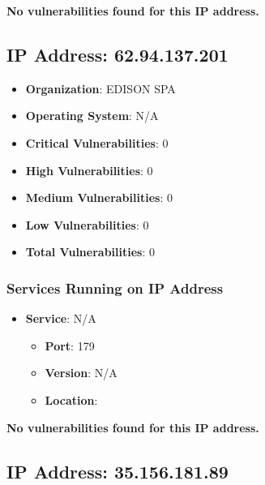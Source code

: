 \documentclass{article}
\begin{document}
\textbf{No vulnerabilities found for this IP address.}




\clearpage



\subsection{IP Address: 62.94.137.201}

\begin{itemize}
    \item \textbf{Organization}: EDISON SPA
    \item \textbf{Operating System}:  N/A 
    \item \textbf{Critical Vulnerabilities}: 0
    \item \textbf{High Vulnerabilities}: 0
    \item \textbf{Medium Vulnerabilities}: 0
    \item \textbf{Low Vulnerabilities}: 0
    \item \textbf{Total Vulnerabilities}: 0
\end{itemize}

\subsubsection*{Services Running on IP Address}

\begin{itemize}
    
        \item \textbf{Service}: N/A
        \begin{itemize}
            \item \textbf{Port}: 179
            \item \textbf{Version}:  N/A 
            \item \textbf{Location}: \href{  }{  }
        \end{itemize}
    
\end{itemize}


\textbf{No vulnerabilities found for this IP address.}




\clearpage



\subsection{IP Address: 35.156.181.89}
\end{document}
